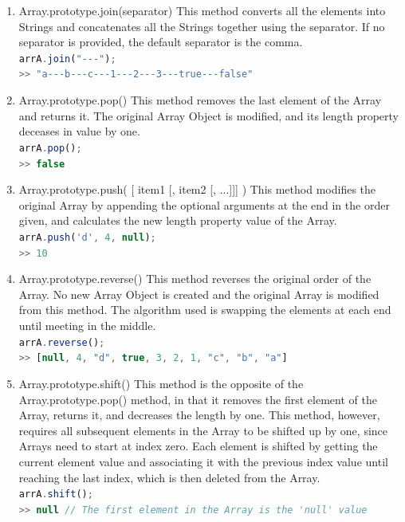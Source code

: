 \documentclass[a4paper,11pt,twoside]{report}
\def\jsinline{\lstinline[language=JavaScript, basicstyle=\small]}%\end{lstlisting}
\begin{document}
\begin{enumerate}
\item Array.prototype.join(separator) \newline
This method converts all the elements into Strings and concatenates all the Strings together using the separator. If no separator is provided, the default separator is the comma.\\
\jsinline|arrA.join("---");|\\
\jsinline|>> "a---b---c---1---2---3---true---false"|

\item Array.prototype.pop() \newline
This method removes the last element of the Array and returns it. The original Array Object is modified, and its length property deceases in value by one.\\
\jsinline|arrA.pop();|\\
\jsinline|>> false|

\item Array.prototype.push( [ item1 [, item2 [, ...]]] ) \newline
This method modifies the original Array by appending the optional arguments at the end in the order given, and calculates the new length property value of the Array.\\
\jsinline|arrA.push('d', 4, null);|\\
\jsinline|>> 10|

\item Array.prototype.reverse() \newline
This method reverses the original order of the Array. No new Array Object is created and the original Array is modified from this method. The algorithm used is swapping the elements at each end until meeting in the middle.\\
\jsinline|arrA.reverse();|\\
\jsinline|>> [null, 4, "d", true, 3, 2, 1, "c", "b", "a"]|

\item Array.prototype.shift() \newline
This method is the opposite of the Array.prototype.pop() method, in that it removes the first element of the Array, returns it, and decreases the length by one. This method, however, requires all subsequent elements in the Array to be shifted up by one, since Arrays need to start at index zero. Each element is shifted by getting the current element value and associating it with the previous index value until reaching the last index, which is then deleted from the Array.\\
\jsinline|arrA.shift();|\\
\jsinline|>> null // The first element in the Array is the 'null' value|


\end{enumerate}
\end{document}
